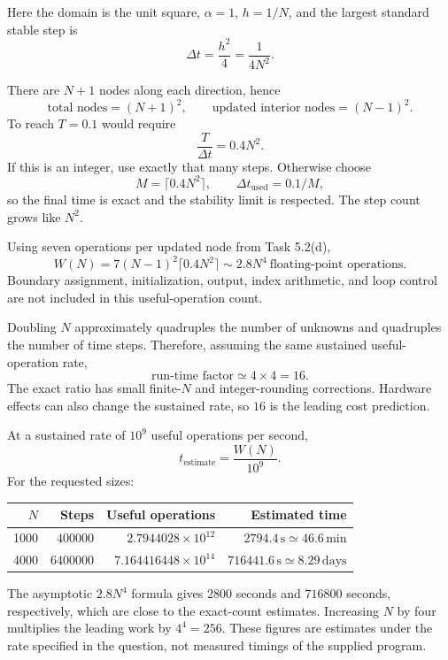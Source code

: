 Here the domain is the unit square, $\alpha=1$, $h=1/N$, and the largest standard stable step is
\[
\Delta t=\frac{h^2}{4}=\frac{1}{4N^2}.
\]

There are $N+1$ nodes along each direction, hence
\[
\boxed{\text{total nodes}=(N+1)^2,\qquad \text{updated interior nodes}=(N-1)^2.}
\]
To reach $T=0.1$ would require
\[
\frac{T}{\Delta t}=0.4N^2.
\]
If this is an integer, use exactly that many steps. Otherwise choose
\[
\boxed{M=\lceil0.4N^2\rceil,\qquad \Delta t_{\mathrm{used}}=0.1/M,}
\]
so the final time is exact and the stability limit is respected. The step count grows like $N^2$.

Using seven operations per updated node from Task 5.2(d),
\[
\boxed{W(N)=7(N-1)^2\lceil0.4N^2\rceil\sim2.8N^4\ \text{floating-point operations}.}
\]
Boundary assignment, initialization, output, index arithmetic, and loop control are not included
in this useful-operation count.

Doubling $N$ approximately quadruples the number of unknowns and quadruples the number of
time steps. Therefore, assuming the same sustained useful-operation rate,
\[
\boxed{\text{run-time factor}\simeq4\times4=16.}
\]
The exact ratio has small finite-$N$ and integer-rounding corrections. Hardware effects can
also change the sustained rate, so $16$ is the leading cost prediction.

At a sustained rate of $10^9$ useful operations per second,
\[
t_{\mathrm{estimate}}=\frac{W(N)}{10^9}.
\]
For the requested sizes:
\begin{center}
\begin{tabular}{rrrr}
\toprule
$N$ & Steps & Useful operations & Estimated time\\
\midrule
1000 & $400000$ & $2.7944028\times10^{12}$ & $2794.4\,\mathrm{s}\simeq46.6\,\mathrm{min}$\\
4000 & $6400000$ & $7.164416448\times10^{14}$ & $716441.6\,\mathrm{s}\simeq8.29\,\mathrm{days}$\\
\bottomrule
\end{tabular}
\end{center}
The asymptotic $2.8N^4$ formula gives $2800$ seconds and $716800$ seconds, respectively,
which are close to the exact-count estimates. Increasing $N$ by four multiplies the leading
work by $4^4=256$. These figures are estimates under the rate specified in the question,
not measured timings of the supplied program.

